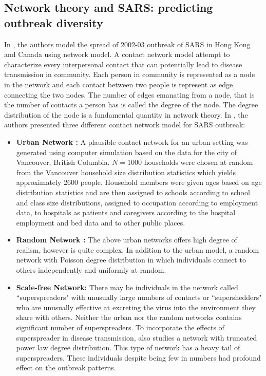 \documentclass[12pt, journal,onecolumn]{IEEEtran}
\begin{document}
\subsection{Network theory and SARS: predicting outbreak diversity \cite{meyers2005network}}

In \cite{meyers2005network}, the authors model the spread of 2002-03 outbreak of SARS in Hong Kong and Canada using network model. A contact network model attempt to characterize every interpersonal contact that can potentially lead to disease transmission in community. Each person in community is represented as a node in the network and each contact between two people is represent as edge connecting the two nodes. The number of edges emanating from a node, that is the number of contacts a person has is called the degree of the node. The degree distribution of the node is a fundamental quantity in network theory.   In \cite{meyers2005network}, the authors presented three different contact network model for SARS outbreak:

\begin{itemize}
\item \textbf{Urban Network : }  A plausible contact network for an urban setting was generated using computer simulation based on the data for the city of Vancouver, British Columbia. $N=1000$ households were chosen at random from the Vancouver household size distribution statistics which yields approximately 2600 people. Household members were given ages based on age distribution statistics and are then assigned to schools according to school and class size distributions, assigned to occupation according to employment data, to hospitals as patients and caregivers according to the hospital employment and bed data and to other public places.
\item \textbf{Random Network : } The above urban networks offers high degree of realism, however is quite complex. In addition to the urban model, a random network with Poisson degree distribution in which individuals connect to others independently and uniformly at random.
\item \textbf{Scale-free Network: } There may be individuals in the network called ``superspreaders" with unusually large numbers of contacts or ``supershedders" who are unusually effective at excreting the virus into the environment they share with others. Neither the urban nor the random networks contains significant number of superspreaders. To incorporate the effects of superspreader in disease transmission, \cite{meyers2005network} also studies a network with truncated power law degree distribution. This type of network has a heavy tail of superspreaders. These individuals despite being few in numbers had profound effect on the outbreak patterns.
\end{itemize}
\end{document}
